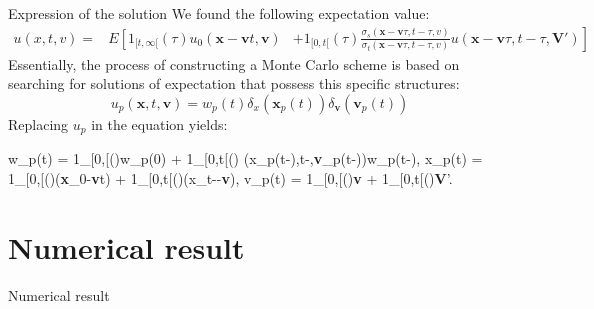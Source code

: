 \documentclass{beamer}
\def\\{}%
\begin{document}
	\begin{frame}{Expression of the solution}
		We found the following expectation value:
		\begin{equation*}
			\begin{split}
				u(x, t, v) = & E\left[1_{[t, \infty[}(\tau)u_0(\textbf{x} - \textbf{v}t, \textbf{v}) \right. \\
				& \left. + 1_{[0, t[}(\tau)\frac{\sigma_s(\textbf{x} - \textbf{v}\tau, t - \tau, v)}{\sigma_t(\textbf{x} - \textbf{v}\tau, t - \tau, v)}u(\textbf{x} - \textbf{v}\tau, t - \tau, \textbf{V}')\right]
			\end{split}
		\end{equation*}
		Essentially, the process of constructing a Monte Carlo scheme is based on searching for solutions of expectation that possess this specific structures:
		\begin{equation*}
			u_p(\textbf{x},t,\textbf{v}) = w_p(t) \delta_x(\textbf{x}_p(t))\delta_\textbf{v}(\textbf{v}_p(t))
		\end{equation*}
		Replacing \(u_p\) in the equation yields:
		
		\begin{cases} 
			w_p(t) = 1_{[0,\infty[}(\tau)w_p(0) + 1_{[0,t[}(\tau) (x_p(t-\tau),t-\tau,\textbf{v}_p(t-\tau))w_p(t-\tau),\\
			x_p(t) = 1_{[0,\infty[}(\tau)(\textbf{x}_0-\textbf{v}t) + 1_{[0,t[}(\tau)(x_{t-\tau}-\textbf{v}\tau),\\
			v_p(t) = 1_{[0,\infty[}(\tau)\textbf{v} + 1_{[0,t[}(\tau)\textbf{V}'. 
		\end{cases}
	\end{frame}
	
	\section{Numerical result}
	\begin{frame}{Numerical result}
		
	\end{frame}
	
	
\end{document}
